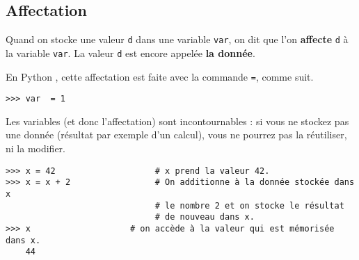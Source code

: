 %
%

\subsection{Affectation}

\begin{defi}[Affectation]
Quand on stocke une valeur \lstinline{d} dans une variable \lstinline{var}, on dit que l'on 
\textbf{affecte} \lstinline{d} à la variable \lstinline{var}. La valeur
\lstinline{d} est encore appelée \textbf{la donnée}.
\end{defi}

En Python , cette affectation est faite avec la commande \lstinline{=}, comme suit.  

\begin{lstlisting}
>>> var  = 1
\end{lstlisting}


Les variables (et donc l'affectation) sont incontournables : si vous ne stockez pas une donnée 
(résultat par exemple d'un calcul), vous ne pourrez pas la réutiliser, ni la modifier.

\begin{lstlisting}
>>> x = 42                    # x prend la valeur 42.
>>> x = x + 2                 # On additionne à la donnée stockée dans x 
                              # le nombre 2 et on stocke le résultat  
                              # de nouveau dans x.
>>> x                    # on accède à la valeur qui est mémorisée dans x.
	44
\end{lstlisting}

